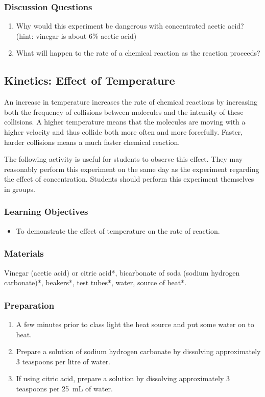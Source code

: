 \subsubsection*{Discussion Questions}
\begin{enumerate}
\item{Why would this experiment be dangerous with concentrated acetic acid? (hint: vinegar is about 6\% acetic acid)}
\item{What will happen to the rate of a chemical reaction as the reaction proceeds?}
\end{enumerate}

\subsection{Kinetics: Effect of Temperature}

An increase in temperature increases the rate of chemical reactions by increasing both the frequency of collisions between molecules and the intensity of these collisions. A higher temperature means that the molecules are moving with a higher velocity and thus collide both more often and more forcefully. Faster, harder collisions means a much faster chemical reaction.

The following activity is useful for students to observe this effect. They may reasonably perform this experiment on the same day as the experiment regarding the effect of concentration. Students should perform this experiment themselves in groups.

\subsubsection*{Learning Objectives}
\begin{itemize}
\item{To demonstrate the effect of temperature on the rate of reaction.}
\end{itemize}

\subsubsection*{Materials}
Vinegar (acetic acid) or citric acid*, bicarbonate of soda (sodium hydrogen carbonate)*, beakers*, test tubes*, water, source of heat*.

\subsubsection*{Preparation}
\begin{enumerate}
\item{A few minutes prior to class light the heat source and put some water on to heat.}
\item{Prepare a solution of sodium hydrogen carbonate by dissolving approximately 3 teaspoons per litre of water.}
\item{If using citric acid, prepare a solution by dissolving approximately 3 teaspoons per 25~mL of water.}
\end{enumerate}


